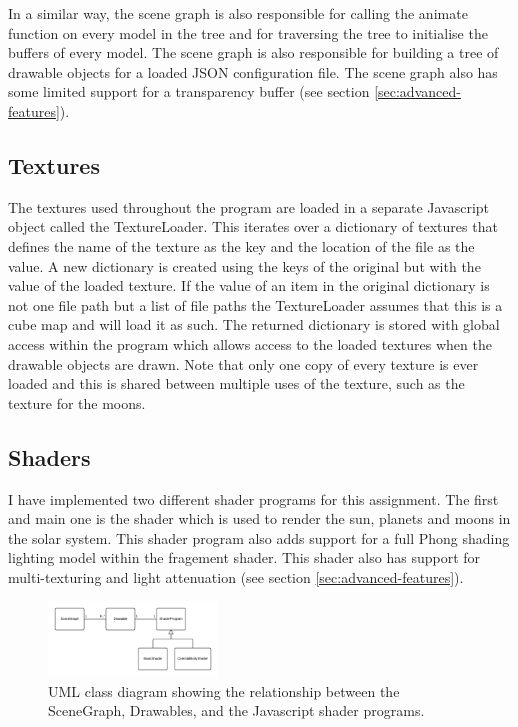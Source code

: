 \documentclass[conference]{IEEEtran}
\begin{document}
In a similar way, the scene graph is also responsible for calling the animate function on every model in the tree and for traversing the tree to initialise the buffers of every model. The scene graph is also responsible for building a tree of drawable objects for a loaded JSON configuration file. The scene graph also has some limited support for a transparency buffer (see section \ref{sec:advanced-features}).

\subsection{Textures}
The textures used throughout the program are loaded in a separate Javascript object called the TextureLoader. This iterates over a dictionary of textures that defines the name of the texture as the key and the location of the file as the value. A new dictionary is created using the keys of the original but with the value of the loaded texture. If the value of an item in the original dictionary is not one file path but a list of file paths the TextureLoader assumes that this is a cube map and will load it as such. The returned dictionary is stored with global access within the program which allows access to the loaded textures when the drawable objects are drawn. Note that only one copy of every texture is ever loaded and this is shared between multiple uses of the texture, such as the texture for the moons.

\subsection{Shaders}
I have implemented two different shader programs for this assignment. The first and main one is the shader which is used to render the sun, planets and moons in the solar system. This shader program also adds support for a full Phong shading lighting model within the fragement shader. This shader also has support for multi-texturing and light attenuation (see section \ref{sec:advanced-features}).

\begin{figure}[!t]
\centering
\includegraphics[width=0.4\textwidth]{img/shader-uml.png}
\caption{UML class diagram showing the relationship between the SceneGraph, Drawables, and the Javascript shader programs.}
\label{fig:shaders-uml}
\end{figure}
\end{document}
